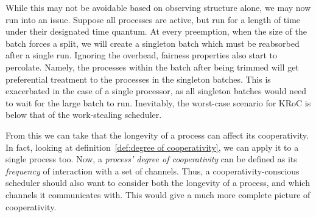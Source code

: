 While this may not be avoidable based on observing structure alone, we may now 
run into an issue. Suppose all processes are active, but run for a length of time under their
designated time quantum. At every preemption, when the size of the batch forces 
a split, we will create a singleton batch which must be reabsorbed after a 
single run. Ignoring the overhead, fairness properties also start to percolate.
Namely, the processes within the batch after being trimmed will get preferential
treatment to the processes in the singleton batches. This is exacerbated in the case of 
a single processor, as all singleton batches would need to wait for the large batch to run. 
Inevitably, the worst-case scenario for KRoC is below that of the work-stealing scheduler.

From this we can take that the longevity of a process can affect its 
cooperativity. In fact, looking at 
definition~\ref{def:degree of cooperativity}, we can apply it to a single 
process too. Now, a \emph{process' degree of cooperativity} can be defined as 
its \emph{frequency} of interaction with a set of channels.
Thus, a cooperativity-conscious scheduler should also want to consider both
the longevity of a process, and which channels it communicates with. This would
give a much more complete picture of cooperativity.

